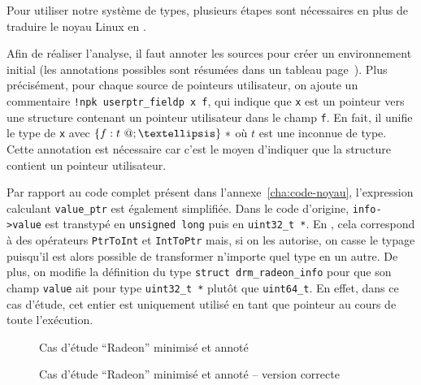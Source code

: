 Pour utiliser notre système de types, plusieurs étapes sont nécessaires en plus
de traduire le noyau Linux en \newspeak{}.

Afin de réaliser l'analyse, il faut annoter les sources pour créer un
environnement initial (les annotations possibles sont résumées dans un tableau
page~\pageref{page:tab-anns}). Plus précisément, pour chaque source de pointeurs
utilisateur, on ajoute un commentaire \texttt{!npk userptr\_fieldp x f}, qui
indique que \texttt{x} est un pointeur vers une structure contenant un pointeur
utilisateur dans le champ \texttt{f}. En fait, il unifie le type de \texttt{x}
avec $\{ f: \ptrU{t} ; … \}~*$ où $t$ est une inconnue de type. Cette annotation
est nécessaire car c'est le moyen d'indiquer que la structure contient un
pointeur utilisateur.

Par rapport au code complet présent dans l'annexe~\ref{cha:code-noyau},
l'expression calculant \texttt{value_ptr} est également simplifiée. Dans le code
d'origine, \texttt{info->value} est transtypé en \texttt{unsigned long} puis en
\texttt{uint32\_t *}. En \newspeak, cela correspond à des opérateurs
\texttt{PtrToInt} \linebreak et \texttt{IntToPtr} mais, si on les autorise, on
casse le typage puisqu'il est alors possible de transformer n'importe quel type
en un autre. De plus, on modifie la définition du type \texttt{struct
drm\_radeon\_info} pour que son champ \texttt{value} ait pour type
\texttt{uint32\_t *} plutôt que \texttt{uint64\_t}. En effet, dans ce cas
d'étude, cet entier est uniquement utilisé en tant que pointeur au cours de
toute l'exécution.


\begin{figure}[p]

\caption{Cas d'étude \enquote{Radeon} minimisé et annoté}
\label{fig:ex-drm}
\end{figure}


\begin{figure}[p]


    \caption{Cas d'étude \enquote{Radeon} minimisé et annoté -- version correcte}
    \label{fig:ex-drm-ok}

\end{figure}

